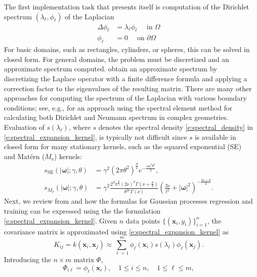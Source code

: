 The first implementation task that presents itself is computation of the Dirichlet spectrum $(\lambda_\ell, \phi_\ell)$ of the Laplacian
\begin{align}
\Delta \phi_\ell &= \lambda_\ell \phi_\ell \quad\text{ in } \Omega \\
\phi_\ell &= 0 \quad\text{ on } \partial\Omega
\end{align}
For basic domains, such as rectangles, cylinders, or spheres, this can be solved in closed form. For general domains, the problem must be discretized and an approximate spectrum computed. 
 obtain an approximate spectrum by discretizing the Laplace operator with a finite difference formula and applying a correction factor to the eigenvalues of the resulting matrix. There are many other approaches for computing the spectrum of the Laplacian with various boundary conditions; see, e.g.,  for an approach using the spectral element method for calculating both Dirichlet and Neumann spectrum in complex geometries. 
Evaluation of $s(\lambda_\ell)$, where $s$ denotes the spectral density \eqref{e:spectral_density} in \eqref{e:spectral_expansion_kernel}, is typically not difficult since $s$ is available in closed form for many stationary kernels, such as the squared exponential (SE) and Mat\'ern ($M_{\nu}$) kernels:
\begin{align}
s_{\text{SE}}(|\bm{\omega}|; \gamma, \theta) &=
\gamma^2 (2\pi\theta^2)^{\frac{d}{2}}e^{-\frac{|\bm{\omega}|^2 \theta^2}{2}},\\
s_{M_{\nu}}(|\bm{\omega}|; \gamma, \theta) &= 
\gamma^2 \frac{2^d \pi^{\frac{d}{2}} (2\nu)^\nu \Gamma(\nu + \frac{d}{2})}
{\theta^{2\nu}\Gamma(\nu) }
\left(
\frac{2\nu}{\ell^2} + |\bm{\omega}|^2
\right)^{-\frac{2\nu + d}{2}}. 
\end{align}
Next, we review from  and  how the formulas for Gaussian processes regression and training can be expressed using the the formulation \eqref{e:spectral_expansion_kernel}. 
Given $n$ data points $\{(\mathbf{x}_i, y_i)\}_{i=1}^n$, 
the covariance matrix is approximated
using \eqref{e:spectral_expansion_kernel} as
\begin{equation}
K_{ij} = k(\mathbf{x}_i,\mathbf{x}_j) \approx 
\sum_{\ell=1}^m 
\phi_{\ell}(\mathbf{x}_i) s(\lambda_\ell) 
\phi_{\ell}(\mathbf{x}_j).
\end{equation}
Introducing the $n \times m$ matrix $\Phi$,
\begin{equation}
{\Phi}_{i \ell} = 
\phi_{\ell}(\mathbf{x}_i), 
\quad 1 \le i \le n,
\quad 1 \le \ell \le m, 
\end{equation}
